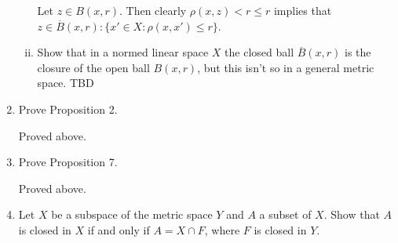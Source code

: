 \begin{enumerate}
\begin{enumerate}[(i)]
        Let $z\in B(x,r)$. 
        Then clearly $\rho(x,z)<r\le r$ implies that $z\in\overline{B}(x,r):\{x'\in X:\rho(x,x')\le r\}$.
        \item Show that in a normed linear space $X$ the closed ball $\overline{B}(x,r)$ is the closure of the open ball $B(x,r)$, but this isn't so in a general metric space.
        TBD
    \end{enumerate}
    \item Prove Proposition 2.

    Proved above.
    \item Prove Proposition 7.
    
    Proved above.
    \item Let $X$ be a subspace of the metric space $Y$ and $A$ a subset of $X$.
    Show that $A$ is closed in $X$ if and only if $A=X\cap F$, where $F$ is closed in $Y$.
    

\end{enumerate}
